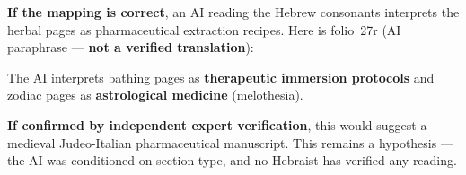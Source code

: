 \documentclass[11pt,a4paper]{article}
\begin{document}
\begin{tcolorbox}[title={\large Figure 5: How the AI interprets the decoded consonants (HYPOTHESIS)}]
\textbf{If the mapping is correct}, an AI reading the Hebrew consonants
interprets the herbal pages as pharmaceutical extraction recipes.
Here is folio~27r (AI paraphrase --- \textbf{not a verified translation}):

\medskip
\begin{center}
\end{center}

\medskip
\noindent The AI interprets bathing pages as \textbf{therapeutic immersion protocols}
and zodiac pages as \textbf{astrological medicine} (melothesia).

\medskip
\noindent\textbf{If confirmed by independent expert verification}, this would
suggest a medieval Judeo-Italian pharmaceutical manuscript. This remains
a hypothesis --- the AI was conditioned on section type, and no Hebraist
has verified any reading.
\end{tcolorbox}

\bigskip
\end{document}

